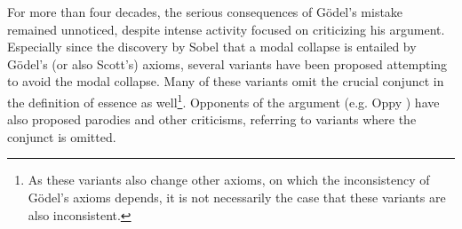 \documentclass{article}
\begin{document}

For more than four decades, the serious consequences of G\"odel's mistake remained unnoticed, despite intense activity focused on criticizing his argument. Especially since the discovery by Sobel \cite{Sobel} that a modal collapse is entailed by G\"odel's (or also Scott's) axioms, several variants have been proposed \cite{Anderson,AndersonGettings1968,Hajek,Hajek2,Hajek3,Bjordal} attempting to avoid the modal collapse. Many of these variants omit the crucial conjunct in the definition of essence as well\footnote{As these variants also change other axioms, on which the inconsistency of G\"odel's axioms depends, it is not necessarily the case that these variants are also inconsistent.}. Opponents of the argument (e.g. Oppy \cite[p.226/227]{Oppy1996} \cite[p.364]{Oppy2000} \cite[p.1068]{Oppy2008}) have also proposed parodies and other criticisms, referring to variants where the conjunct is omitted.






\end{document}
